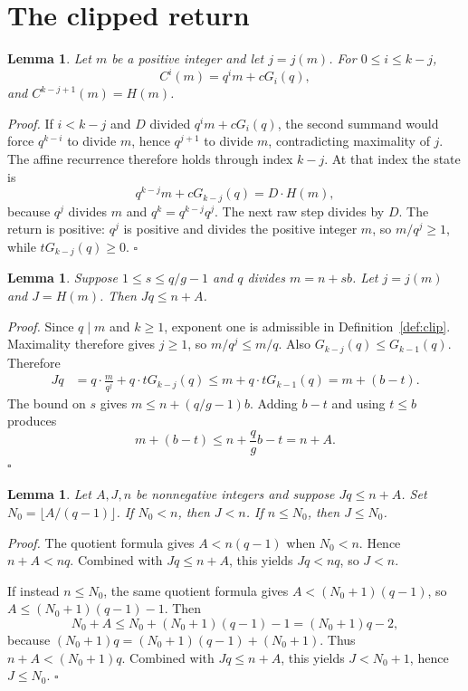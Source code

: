 \documentclass[11pt,letterpaper]{article}
\newtheorem{lemma}[theorem]{Lemma}
\newenvironment{proof}{\noindent\textit{Proof.}}{\hfill\(\square\)}
\begin{document}
\section{The clipped return}

\begin{lemma}
\label{lem:closed}
Let \(m\) be a positive integer and let \(j=j(m)\). For \(0\le i\le k-j\),
\[
C^i(m)=q^im+cG_i(q),
\]
and \(C^{k-j+1}(m)=H(m)\).
\end{lemma}

\begin{proof}
If \(i<k-j\) and \(D\) divided \(q^im+cG_i(q)\), the second summand would force \(q^{k-i}\) to divide \(m\), hence \(q^{j+1}\) to divide \(m\), contradicting maximality of \(j\). The affine recurrence therefore holds through index \(k-j\). At that index the state is
\[
q^{k-j}m+cG_{k-j}(q)=D\cdot H(m),
\]
because \(q^j\) divides \(m\) and \(q^k=q^{k-j}q^j\). The next raw step divides by \(D\). The return is positive: \(q^j\) is
positive and divides the positive integer \(m\), so \(m/q^j\ge1\), while
\(tG_{k-j}(q)\ge0\).
\end{proof}

\begin{lemma}
\label{lem:product}
Suppose \(1\le s\le q/g-1\) and \(q\) divides \(m=n+sb\). Let \(j=j(m)\) and \(J=H(m)\). Then \(Jq\le n+A\).
\end{lemma}

\begin{proof}
Since \(q\mid m\) and \(k\ge1\), exponent one is admissible in
Definition~\ref{def:clip}. Maximality therefore gives \(j\ge1\), so
\(m/q^j\le m/q\). Also \(G_{k-j}(q)\le G_{k-1}(q)\). Therefore
\begin{align*}
Jq
&=q\cdot\frac{m}{q^j}+q\cdot tG_{k-j}(q)
\le m+q\cdot tG_{k-1}(q)
=m+(b-t).
\end{align*}
The bound on \(s\) gives \(m\le n+(q/g-1)b\). Adding \(b-t\) and using \(t\le b\) produces
\[
m+(b-t)\le n+\frac{q}{g}b-t=n+A.
\]
\end{proof}

\begin{lemma}
\label{lem:threshold}
Let \(A,J,n\) be nonnegative integers and suppose \(Jq\le n+A\). Set \(N_0=\lfloor A/(q-1)\rfloor\). If \(N_0<n\), then \(J<n\). If \(n\le N_0\), then \(J\le N_0\).
\end{lemma}

\begin{proof}
The quotient formula gives \(A<n(q-1)\) when \(N_0<n\). Hence \(n+A<nq\). Combined with \(Jq\le n+A\), this yields \(Jq<nq\), so \(J<n\).

If instead \(n\le N_0\), the same quotient formula gives \(A<(N_0+1)(q-1)\), so \(A\le (N_0+1)(q-1)-1\). Then
\[
N_0+A\le N_0+(N_0+1)(q-1)-1=(N_0+1)q-2,
\]
because \((N_0+1)q=(N_0+1)(q-1)+(N_0+1)\). Thus \(n+A<(N_0+1)q\). Combined with \(Jq\le n+A\), this yields \(J<N_0+1\), hence \(J\le N_0\).
\end{proof}
\end{document}
